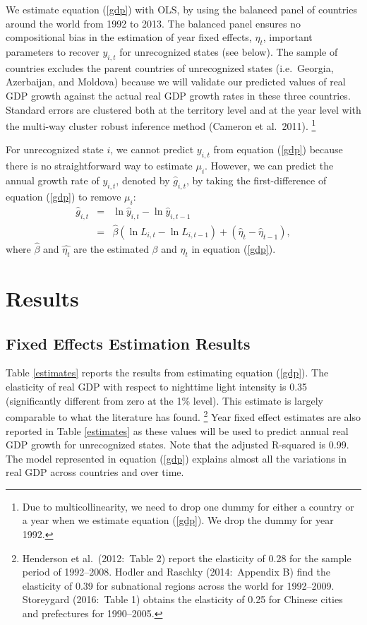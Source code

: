 \documentclass[12pt,a4paper]{article}%
\begin{document}
We estimate equation (\ref{gdp}) with OLS, by using the balanced panel of countries around the world from 1992 to 2013. The balanced panel ensures no compositional bias in the estimation of year fixed effects, $\eta_t$, important parameters to recover $y_{i,t}$ for unrecognized states (see below). 
The sample of countries excludes the parent countries of unrecognized states (i.e.\ Georgia, Azerbaijan, and Moldova) because we will validate our predicted values of real GDP growth against the actual real GDP growth rates in these three countries.
Standard errors are clustered both at the territory level and at the year level with the multi-way cluster robust inference method (Cameron et al.\ 2011).%
\footnote{Due to multicollinearity, we need to drop one dummy for either a country or a year when we estimate equation (\ref{gdp}). We drop the dummy for year 1992.}

For unrecognized state $i$, we cannot predict $y_{i,t}$ from equation (\ref{gdp}) because there is no straightforward way to estimate $\mu_i$. However, we can predict the annual growth rate of $y_{i,t}$, denoted by $\hat{g}_{i,t}$, by taking the first-difference of equation (\ref{gdp}) to remove $\mu_i$:
\begin{eqnarray}\label{growth}
\hat{g}_{i,t} 
&=& \ln \hat{y}_{i,t} - \ln \hat{y}_{i, t-1} \nonumber \\
&=& \hat{\beta} (\ln L_{i,t} - \ln L_{i,t-1}) + (\hat{\eta}_t - \hat{\eta}_{t-1}),
\end{eqnarray}
where $\hat{\beta}$ and $\hat{\eta_t}$ are the estimated $\beta$ and $\eta_t$ in equation (\ref{gdp}).

\section{Results}\label{results}
\subsection{Fixed Effects Estimation Results}
Table \ref{estimates} reports the results from estimating equation (\ref{gdp}). 
The elasticity of real GDP with respect to nighttime light intensity is 0.35 (significantly different from zero at the 1\% level).
This estimate is largely comparable to what the literature has found.%
\footnote{
	Henderson et al.\ (2012:\ Table 2) report the elasticity of 0.28 for the sample period of 1992--2008. Hodler and Raschky (2014:\ Appendix B) find the elasticity of 0.39 for subnational regions across the world for 1992--2009. Storeygard (2016:\ Table 1) obtains the elasticity of 0.25 for Chinese cities and prefectures for 1990--2005. 
}   
Year fixed effect estimates are also reported in Table \ref{estimates} as these values will be used to predict annual real GDP growth for unrecognized states. 
Note that the adjusted R-squared is 0.99. 
The model represented in equation (\ref{gdp}) explains almost all the variations in real GDP across countries and over time. 
\end{document}
